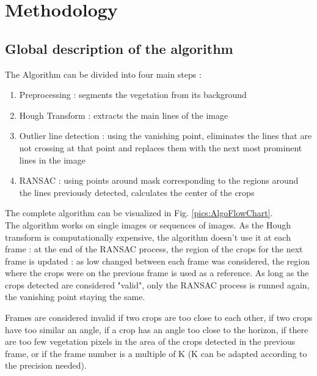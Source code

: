 \chapter{Methodology}
\label{sec:latexumg}

\section{Global description of the algorithm}
\label{sec:gliederung}

The Algorithm can be divided into four main steps : 
\begin{enumerate}
    \item Preprocessing : segments the vegetation from its background
    \item Hough Transform : extracts the main lines of the image  
    \item Outlier line detection : using the vanishing point, eliminates the lines that are not crossing at that point and replaces them with the next most prominent lines in the image
    \item RANSAC : using points around mask corresponding to the regions around the lines previously detected, calculates the center of the crops
\end{enumerate}

The complete algorithm can be visualized in Fig. \ref{pics:AlgoFlowChart}. \\

The algorithm works on single images or sequences of images. As the Hough transform is computationally expensive, the algorithm doesn't use it at each frame : at the end of the RANSAC process, the region of the crops for the next frame is updated : as low changed between each frame was considered, the region where the crops were on the previous frame is used as a reference. As long as the crops detected are considered "valid", only the RANSAC process is runned again, the vanishing point staying the same. 

Frames are considered invalid if two crops are too close to each other, if two crops have too similar an angle, if a crop has an angle too close to the horizon, if there are too few vegetation pixels in the area of the crops detected in the previous frame, or if the frame number is a multiple of K (K can be adapted according to the precision needed).

